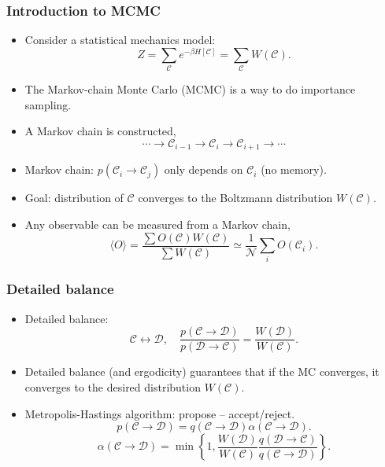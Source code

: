 \documentclass[xcolor=table, 10pt, aspectratio=169]{beamer}
\begin{document}
\begin{frame}
  \frametitle{Introduction to MCMC}
  \begin{itemize}
    \item Consider a statistical mechanics model:
    \[Z=\sum_{\mathcal C}e^{-\beta H[\mathcal C]} = \sum_{\mathcal C}W(\mathcal C).\]
    \item The Markov-chain Monte Carlo (MCMC) is a way to do importance sampling.
    \item A Markov chain is constructed,
    \[\cdots\rightarrow\mathcal C_{i-1}\rightarrow\mathcal C_i\rightarrow\mathcal C_{i+1}\rightarrow\cdots\]
    \item Markov chain: $p(\mathcal C_i\rightarrow\mathcal C_j)$ only depends on $\mathcal C_i$ (no memory).
    \item Goal: distribution of $\mathcal C$ converges to the Boltzmann distribution $W(\mathcal C)$.
    \item Any observable can be measured from a Markov chain,
    \[\langle O\rangle = \frac{\sum O(\mathcal C)W(\mathcal C)}{\sum W(\mathcal C)} \simeq
     \frac1{\mathcal N}\sum_iO(\mathcal C_i).\]
  \end{itemize}
\end{frame}

\begin{frame}
  \frametitle{Detailed balance}
  \begin{itemize}
    \item Detailed balance:
    \[\mathcal C\leftrightarrow\mathcal D,\quad
		\frac{p(\mathcal C\rightarrow\mathcal D)}{p(\mathcal D\rightarrow\mathcal C)}=\frac{W(\mathcal D)}{W(\mathcal C)}.\]
    \item Detailed balance (and ergodicity) guarantees that if the MC converges, it converges to the desired distribution $W(\mathcal C)$.
    \item Metropolis-Hastings algorithm: propose -- accept/reject.
    \[p(\mathcal C\rightarrow\mathcal D) = q(\mathcal C\rightarrow\mathcal D)
    \alpha(\mathcal C\rightarrow\mathcal D).\]
    \[\alpha(\mathcal C\rightarrow\mathcal D) =
    \min\left\{1, \frac{W(\mathcal D)}{W(\mathcal C)}
    \frac{q(\mathcal D\rightarrow\mathcal C)}
    {q(\mathcal C\rightarrow\mathcal D)}\right\}.\]
  \end{itemize}
\end{frame}
\end{document}

